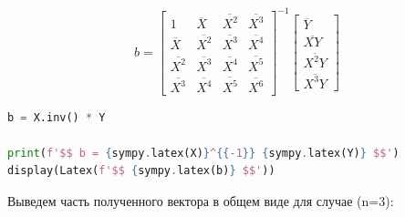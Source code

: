 \documentclass[a4paper, 14pt]{extarticle}
\begin{document}
\begin{equation*}
    b = \left[\begin{matrix}1 & \overline{X} & \overline{X^2} & \overline{X^3}\\\overline{X} & \overline{X^2} & \overline{X^3} & \overline{X^4}\\\overline{X^2} & \overline{X^3} & \overline{X^4} & \overline{X^5}\\\overline{X^3} & \overline{X^4} & \overline{X^5} & \overline{X^6}\end{matrix}\right]^{-1} \left[\begin{matrix}\overline{Y}\\\overline{XY}\\\overline{X^2Y}\\\overline{X^3Y}\end{matrix}\right]
\end{equation*}

\begin{center}
    \begin{lstlisting}[language=Python]
b = X.inv() * Y

print(f'$$ b = {sympy.latex(X)}^{{-1}} {sympy.latex(Y)} $$')
display(Latex(f'$$ {sympy.latex(b)} $$'))
    \end{lstlisting}
\end{center}

Выведем часть полученного вектора в общем виде для случае (n=3):
\end{document}
